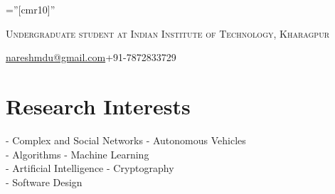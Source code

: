\documentclass[a4paper,10pt]{article} %
\begin{document}
\pagestyle{empty} %

\font\fb=''[cmr10]'' %


\par{\bigskip\par} %
\par{\centering\large {\textsc{Undergraduate student at Indian Institute of Technology, Kharagpur}}\par}\large
\hspace{2cm}\normalsize {\href{mailto:nareshmdu@gmail.com}{nareshmdu@gmail.com}}\hfill{+91-7872833729}\hspace{2cm}

%


\section{Research Interests}

- Complex and Social Networks\hfill
- Autonomous Vehicles\hspace{3cm} \\
- Algorithms\hfill
- Machine Learning\hspace{3.6cm} \\
- Artificial Intelligence\hfill
- Cryptography\hspace{4.25cm} \\
- Software Design
\end{document}
